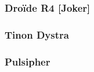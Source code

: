 \subsubsection{Droïde R4 [Joker]}

\subsubsection{Tinon Dystra} \label{sec:tinon-dystra}

\subsubsection{Pulsipher} \label{sec:pulsipher}